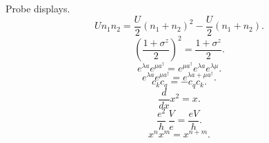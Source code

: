 \documentclass{article}
\begin{document}
Probe displays.
\begin{equation}
U n_1 n_2 = \frac{U}{2}\left(n_1 + n_2\right)^2 - \frac{U}{2}\left(n_1 + n_2\right) .
\label{eq:hub}
\end{equation}
\begin{equation}
\left(\frac{1+\sigma^z}{2}\right)^2 = \frac{1+\sigma^z}{2} .
\label{eq:proj}
\end{equation}
\begin{equation}
e^{\lambda a}e^{\mu a^\dagger} = e^{\mu a^\dagger}e^{\lambda a}e^{\lambda\mu} .
\label{eq:glauber}
\end{equation}
\begin{equation}
e^{\lambda a}e^{\mu a^\dagger} = e^{\lambda a + \mu a^\dagger} .
\label{eq:bchwrong}
\end{equation}
\begin{equation}
c_k c_q = - c_q c_k .
\label{eq:anti}
\end{equation}
\begin{equation}
\frac{d}{dx} x^2 = x .
\label{eq:dd}
\end{equation}
\begin{equation}
\frac{e^2}{h}\,\frac{V}{e} = \frac{eV}{h} .
\label{eq:charge}
\end{equation}
\begin{equation}
x^n x^m = x^{n+m} .
\label{eq:pow}
\end{equation}
\end{document}
